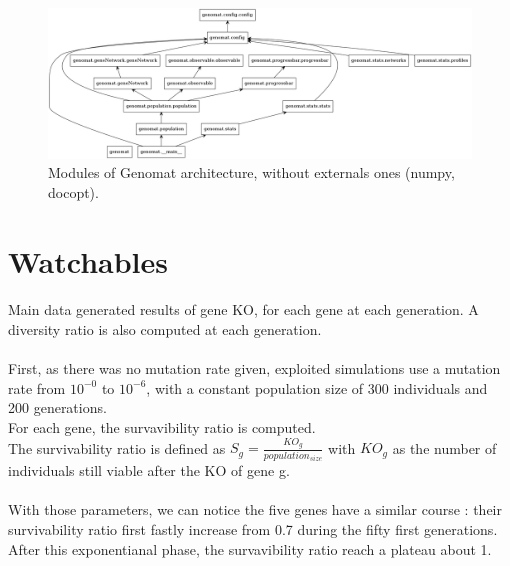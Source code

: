 \documentclass[]{report} %
\begin{document}
        \begin{figure}[H] 
                \centering
                \includegraphics[width=\textwidth]{packages_genomat.png}
                \caption{Modules of Genomat architecture, without externals ones (numpy, docopt).}
                \label{fig:umldiag}
        \end{figure}




\section{Watchables}
    \paragraph*{}
    Main data generated results of gene KO, for each gene at each generation. 
    A diversity ratio is also computed at each generation.
    \paragraph*{}
     First, as there was no mutation rate given, exploited simulations use a mutation rate from $10^{-0}$ to $10^{-6}$, 
     with a constant population size of 300 individuals and 200 generations.\\
     For each gene, the survavibility ratio is computed. \\The survivability ratio is defined as $S_{g} = \frac{KO_g}{population_{size}}$ 
     with $KO_g$ as the number of individuals still viable after the KO of gene g.
    \paragraph*{}
     With those parameters, we can notice the five genes have a similar course : their survivability ratio first fastly 
     increase from 0.7 during the fifty first generations. After this exponentianal phase, the survavibility ratio reach a plateau about 1. 
\end{document}

